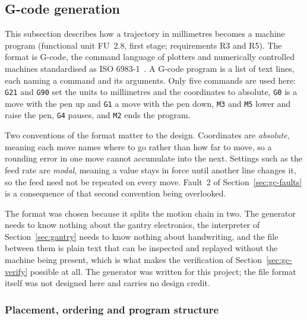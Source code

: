\subsection{G-code generation}
\label{sec:gcode}

This subsection describes how a trajectory in millimetres becomes a machine program (functional unit FU~2.8, first stage; requirements R3 and R5).
The format is G-code, the command language of plotters and numerically controlled machines standardised as ISO 6983-1~\cite{iso6983}. A G-code program is a list of text lines, each naming a command and its arguments. Only five commands are used here: \texttt{G21} and \texttt{G90} set the units to millimetres and the coordinates to absolute, \texttt{G0} is a move with the pen up and \texttt{G1} a move with the pen down, \texttt{M3} and \texttt{M5} lower and raise the pen, \texttt{G4} pauses, and \texttt{M2} ends the program.

Two conventions of the format matter to the design. Coordinates are \emph{absolute}, meaning each move names where to go rather than how far to move, so a rounding error in one move cannot accumulate into the next. Settings such as the feed rate are \emph{modal}, meaning a value stays in force until another line changes it, so the feed need not be repeated on every move. Fault~2 of Section~\ref{sec:gc-faults} is a consequence of that second convention being overlooked.

The format was chosen because it splits the motion chain in two. The generator needs to know nothing about the gantry electronics, the interpreter of Section~\ref{sec:gantry} needs to know nothing about handwriting, and the file between them is plain text that can be inspected and replayed without the machine being present, which is what makes the verification of Section~\ref{sec:gc-verify} possible at all. The generator was written for this project; the file format itself was not designed here and carries no design credit.

\subsubsection{Placement, ordering and program structure}

